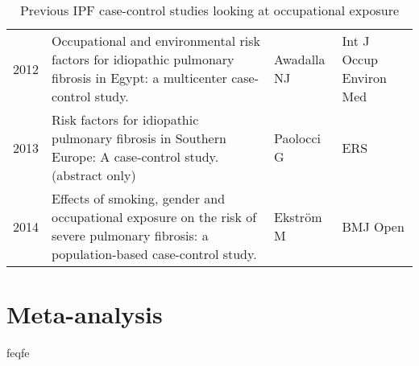 \documentclass[a4paper,12pt]{article}
\begin{document}
\begin{table}
\begin{tabular}{lp{6cm}ll}
    2012    &                Occupational and environmental risk factors for idiopathic pulmonary fibrosis in Egypt: a multicenter case-control study. &                Awadalla NJ &     Int J Occup Environ Med \\
        2013    &                                           Risk factors for idiopathic pulmonary fibrosis in Southern Europe: A case-control study. (abstract only) &                  Paolocci G &      ERS  \\
    2014    &    Effects of smoking, gender and occupational exposure on the risk of severe pulmonary fibrosis: a population-based case-control study. &                  Ekström M &                    BMJ Open \\
    \bottomrule
    \end{tabular}
    \caption{Previous IPF case-control studies looking at occupational exposure}
    \label{table:papers}
\end{table}

\section{Meta-analysis}
feqfe

\clearpage

\makeatletter
 \def\@biblabel#1{#1}
\makeatother



\end{document}
